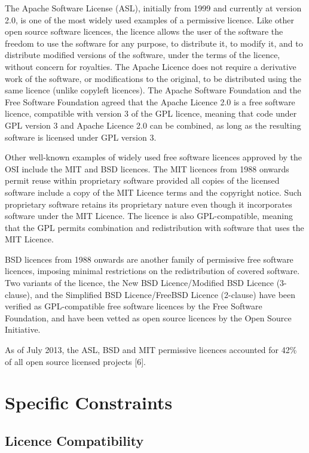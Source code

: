 \documentclass[12pt,a4paper]{article}
\begin{document}
The Apache Software License (ASL), initially from 1999 and currently at version 2.0, is one of the most widely used examples of a permissive licence. Like other open source software licences, the licence allows the user of the software the freedom to use the software for any purpose, to distribute it, to modify it, and to distribute modified versions of the software, under the terms of the licence, without concern for royalties.  The Apache Licence does not require a derivative work of the software, or modifications to the original, to be distributed using the same licence (unlike copyleft licences). The Apache Software Foundation and the Free Software Foundation agreed that the Apache Licence 2.0 is a free software licence, compatible with version 3 of the GPL licence, meaning that code under GPL version 3 and Apache Licence 2.0 can be combined, as long as the resulting software is licensed under GPL version 3. 

Other well-known examples of widely used free software licences approved by the OSI include the MIT and BSD licences. The MIT licences from 1988 onwards permit reuse within proprietary software provided all copies of the licensed software include a copy of the MIT Licence terms and the copyright notice. Such proprietary software retains its proprietary nature even though it incorporates software under the MIT Licence. The licence is also GPL-compatible, meaning that the GPL permits combination and redistribution with software that uses the MIT Licence. 

BSD licences from 1988 onwards are another family of permissive free software licences, imposing minimal restrictions on the redistribution of covered software. Two variants of the licence, the New BSD Licence/Modified BSD Licence (3-clause), and the Simplified BSD Licence/FreeBSD Licence (2-clause) have been verified as GPL-compatible free software licences by the Free Software Foundation, and have been vetted as open source licences by the Open Source Initiative.

As of July 2013, the ASL, BSD and MIT permissive licences accounted for 42\% of all open source licensed projects [6].

\section{Specific Constraints}
\label{sec:SpecificConstraints}

\subsection{Licence Compatibility}
\label{sec:LicenceCompatibility}
\end{document}
